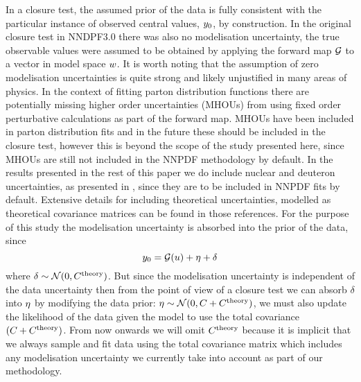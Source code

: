 In a closure test, the assumed prior of the data is fully consistent with the
particular instance of observed central values, $y_0$, by construction.
In the original closure test in NNDPF3.0 there was also no
modelisation uncertainty, the true observable values were assumed to be obtained
by applying the forward map $\mathcal{G}$ to a vector in model space $w$.
It is worth noting that the assumption of zero modelisation uncertainties is
quite strong and likely unjustified in many areas of physics. In the context of
fitting parton distribution functions there are potentially missing higher order
uncertainties (MHOUs) from using fixed order perturbative calculations as part
of the forward map. MHOUs have been included in parton distribution fits
\cite{AbdulKhalek:2019ihb} and in the future these should be included in the
closure test, however this is beyond the scope of the study presented here,
since MHOUs are still not included in the NNPDF methodology by default. In the
results presented in the rest of this paper we do include nuclear and deuteron
uncertainties, as presented in \cite{Ball:2018twp, Ball:2020xqw}, since they are
to be included in NNPDF fits by default. Extensive details for including
theoretical uncertainties, modelled as theoretical covariance matrices can be
found in those references. For the purpose of this study the modelisation
uncertainty is absorbed into the prior of the data, since
\begin{equation}
    y_0 = \mathcal{G}(u) + \eta + \delta
\end{equation}
where $\delta \sim \mathcal{N}(0, C^{\rm theory})$. But since the
modelisation uncertainty is independent of the data uncertainty then from the
point of view of a closure test we can absorb $\delta$ into $\eta$ by
modifying the data prior: $\eta \sim \mathcal{N}(0, C + C^{\rm theory})$,
we must also update the likelihood of the data given the model to use the total
covariance $(C + C^{\rm theory})$. From now onwards we will omit $C^{\rm
theory}$ because it is implicit that we always sample and fit data using the
total covariance matrix which includes any modelisation uncertainty we currently
take into account as part of our methodology.
